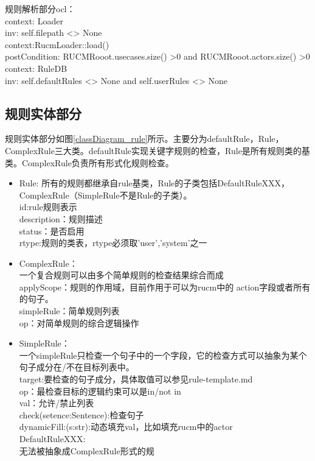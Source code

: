 	规则解析部分ocl：\\
	context: Loader\\
	inv: self.filepath <> None\\
	context:RucmLoader::load()\\
	postCondition: RUCMRooot.usecases.size() >0 and RUCMRooot.actors.size() >0\\ 
	context: RuleDB	\\
	inv: self.defaultRules <> None and self.userRules <> None\\
    \subsection{规则实体部分}
   	规则实体部分如图\ref{classDiagram_rule}所示。主要分为defaultRule，Rule，ComplexRule三大类。defaultRule实现关键字规则的检查，Rule是所有规则类的基类。ComplexRule负责所有形式化规则检查。
    \begin{itemize}

    
    \item	Rule:
    所有的规则都继承自rule基类，Rule的子类包括DefaultRuleXXX，ComplexRule（SimpleRule不是Rule的子类）。\\
    id:rule规则表示\\
    description：规则描述\\
    status：是否启用\\
    rtype:规则的类表，rtype必须取'user','system'之一
    \item	ComplexRule：\\
    一个复合规则可以由多个简单规则的检查结果综合而成\\
    applyScope：规则的作用域，目前作用于可以为rucm中的 action字段或者所有的句子。\\
    simpleRule：简单规则列表\\
    op：对简单规则的综合逻辑操作
    \item	SimpleRule：\\
    一个simpleRule只检查一个句子中的一个字段，它的检查方式可以抽象为某个句子成分在/不在目标列表中。\\
    target:要检查的句子成分，具体取值可以参见rule-template.md\\
    op：最检查目标的逻辑约束可以是in/not in\\
    val：允许/禁止列表\\
    check(setence:Sentence):检查句子\\
    dynamicFill:(s:str):动态填充val，比如填充rucm中的actor\\
    DefaultRuleXXX:\\
    无法被抽象成ComplexRule形式的规\\
\end{itemize}
